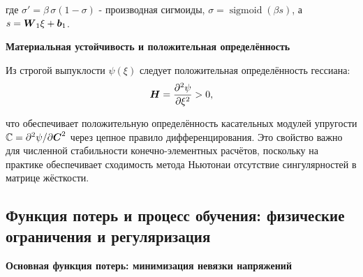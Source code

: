 где $\sigma' = \beta\,\sigma(1-\sigma)$ - производная сигмоиды, 
$\sigma=\operatorname{sigmoid}(\beta s)$, а $s=\boldsymbol{W}_1\xi+\boldsymbol{b}_1$.

\textbf{Материальная устойчивость и положительная определённость}


Из строгой выпуклости \(\psi(\xi)\) следует положительная определённость гессиана:
\begin{equation}
 \boldsymbol{H} = \frac{\partial^2\psi}{\partial\xi^2} > 0,
\label{eq:positive_hessian}
\end{equation}

что обеспечивает положительную определённость касательных модулей упругости 
$\mathbb{C} = \partial^2\psi/\partial\boldsymbol{C}^2$ через цепное правило дифференцирования. 
Это свойство важно для численной стабильности конечно-элементных расчётов, 
поскольку на практике обеспечивает сходимость метода Ньютонаи отсутствие сингулярностей в матрице жёсткости.




\subsection{Функция потерь и процесс обучения: физические ограничения и регуляризация}

\textbf{Основная функция потерь: минимизация невязки напряжений}

